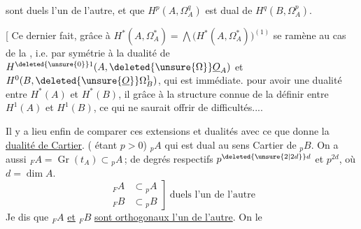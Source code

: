 \margin{$\Vert$}sont duels l'un de l'autre, et que $H^p(A,\Omega_A^q)$ est dual de $H^q(B,\Omega_A^p)$.

[ Ce dernier fait, grâce à $H^*(A,\Omega_A^*)=\bigwedge\bigl(H^*(A,\Omega_A^{*})\bigr)^{(1)}$ se ramène au cas de la , i.e. par symétrie à la dualité de $H^{\deleted{\unsure{0}}1}(A,\deleted{\unsure{\Omega}}\underline{O}_A)$ et $H^0(B,\deleted{\unsure{\underline{O}}}\Omega_B^1)$, qui est immédiate.  pour avoir une dualité entre $H^*(A)$ et $H^*(B)$, il  grâce à la structure connue de la définir entre $H^1(A)$ et $H^1(B)$, ce qui ne saurait offrir de difficultés....

Il y a lieu enfin de comparer ces extensions et dualités avec ce que donne la \uline{dualité de Cartier}.  ( étant $p>0$) $ {}_pA$ qui est dual au sens Cartier de $ {}_pB$. On a aussi $ {}_F A=\operatorname{Gr}(t_A)\subset {}_p A$\,; de degrés respectifs $p^{\deleted{\unsure{2|2d}}d}$ et $p^{2d}$, où $d=\dim A$.
\[
 \left.\begin{aligned}
 {}_F A&\subset {}_p A\\
 {}_F B&\subset {}_p B
 \end{aligned}\right]\ \text{duels l'un de l'autre}
\]
Je dis que $ {}_F A$ \uline{et} $ {}_F B$ \uline{sont orthogonaux l'un de l'autre}.  On le
